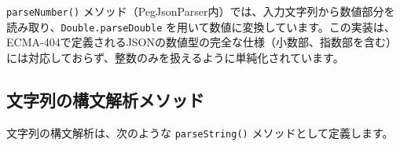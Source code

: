 \begin{Shaded}
\begin{Highlighting}[]
               \NormalTok{(}
                \NormalTok{ + }
\NormalTok{)}
\NormalTok{             );}
\NormalTok{        \}}

        \NormalTok{ \{}
            \NormalTok{();}
             
\NormalTok{        \} }\NormalTok{ (}
              \NormalTok{(}
\NormalTok{        \}}
\NormalTok{    \}}
\end{Highlighting}
\end{Shaded}

\texttt{parseNumber()}
メソッド（PegJsonParser内）では、入力文字列から数値部分を読み取り、\texttt{Double.parseDouble}
を用いて数値に変換しています。この実装は、ECMA-404で定義されるJSONの数値型の完全な仕様（小数部、指数部を含む）には対応しておらず、整数のみを扱えるように単純化されています。

\hypertarget{chapter3-ux6587ux5b57ux5217ux306eux69cbux6587ux89e3ux6790ux30e1ux30bdux30c3ux30c9}{%
\subsection{文字列の構文解析メソッド}\label{chapter3-ux6587ux5b57ux5217ux306eux69cbux6587ux89e3ux6790ux30e1ux30bdux30c3ux30c9}}

文字列の構文解析は、次のような \texttt{parseString()}
メソッドとして定義します。

